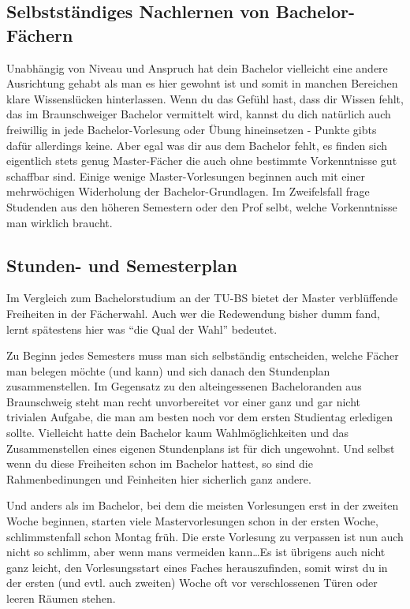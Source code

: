 \subsection{Selbstständiges Nachlernen von Bachelor-Fächern}
Unabhängig von Niveau und Anspruch hat dein Bachelor vielleicht eine andere Ausrichtung gehabt als man es hier gewohnt ist und somit in manchen Bereichen klare Wissenslücken hinterlassen. Wenn du das Gefühl hast, dass dir Wissen fehlt, das im Braunschweiger Bachelor vermittelt wird, kannst du dich natürlich auch freiwillig in jede Bachelor-Vorlesung oder Übung hineinsetzen - Punkte gibts dafür allerdings keine. Aber egal was dir aus dem Bachelor fehlt, es finden sich eigentlich stets genug Master-Fächer die auch ohne bestimmte Vorkenntnisse gut schaffbar sind. Einige wenige Master-Vorlesungen beginnen auch mit einer mehrwöchigen Widerholung der Bachelor-Grundlagen. Im Zweifelsfall frage Studenden aus den höheren Semestern oder den Prof selbt, welche Vorkenntnisse man wirklich braucht.

\subsection{Stunden- und Semesterplan}
Im Vergleich zum Bachelorstudium an der TU-BS bietet der Master verblüffende Freiheiten in der Fächerwahl. Auch wer die Redewendung bisher dumm fand, lernt spätestens hier was "`die Qual der Wahl"' bedeutet.

Zu Beginn jedes Semesters muss man sich selbständig entscheiden, welche Fächer man belegen möchte (und kann) und sich danach den Stundenplan zusammenstellen. Im Gegensatz zu den alteingessenen Bacheloranden aus Braunschweig steht man recht unvorbereitet vor einer ganz und gar nicht trivialen Aufgabe, die man am besten noch vor dem ersten Studientag erledigen sollte. Vielleicht hatte dein Bachelor kaum Wahlmöglichkeiten und das Zusammenstellen eines eigenen Stundenplans ist für dich ungewohnt. Und selbst wenn du diese Freiheiten schon im Bachelor hattest, so sind die Rahmenbedinungen und Feinheiten hier sicherlich ganz andere.

Und anders als im Bachelor, bei dem die meisten Vorlesungen erst in der zweiten Woche beginnen, starten viele Mastervorlesungen schon in der ersten Woche, schlimmstenfall schon Montag früh. Die erste Vorlesung zu verpassen ist nun auch nicht so schlimm, aber wenn mans vermeiden kann\ldots Es ist übrigens auch nicht ganz leicht, den Vorlesungsstart eines Faches herauszufinden, somit wirst du in der ersten (und evtl. auch zweiten) Woche oft vor verschlossenen Türen oder leeren Räumen stehen.

